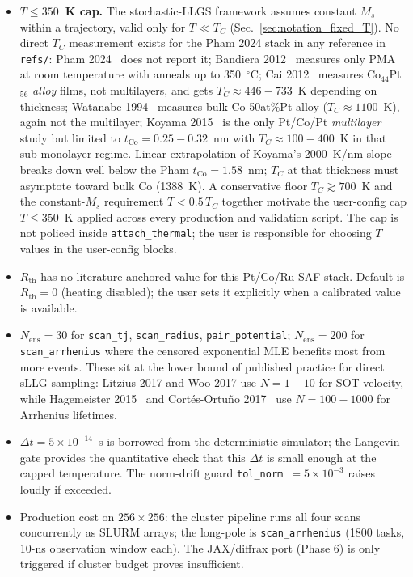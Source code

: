 \documentclass[11pt,a4paper]{article}
\newcommand{\Rth}{R_{\text{th}}}
\begin{document}
\begin{itemize}[leftmargin=2em]
    \item \textbf{$T \le 350$~K cap.} The stochastic-LLGS framework
    assumes constant $M_s$ within a trajectory, valid only for
    $T \ll T_C$ (Sec.~\ref{sec:notation_fixed_T}). No direct $T_C$
    measurement exists for the Pham 2024 stack in any reference in
    \texttt{refs/}: Pham 2024~\cite{pham2024} does not report it;
    Bandiera 2012~\cite{bandiera2012} measures only PMA at room
    temperature with anneals up to 350~$^\circ$C; Cai
    2012~\cite{cai2012} measures Co$_{44}$Pt$_{56}$ \emph{alloy}
    films, not multilayers, and gets $T_C \approx 446{-}733$~K
    depending on thickness; Watanabe 1994~\cite{watanabe1994}
    measures bulk Co-50at\%Pt alloy ($T_C \approx 1100$~K), again
    not the multilayer; Koyama 2015~\cite{koyama2015} is the only
    Pt/Co/Pt \emph{multilayer} study but limited to
    $t_{\text{Co}} = 0.25{-}0.32$~nm with $T_C \approx 100{-}400$~K
    in that sub-monolayer regime. Linear extrapolation of Koyama's
    2000~K/nm slope breaks down well below the Pham
    $t_{\text{Co}} = 1.58$~nm; $T_C$ at that thickness must
    asymptote toward bulk Co (1388~K). A conservative floor
    $T_C \gtrsim 700$~K and the constant-$M_s$ requirement
    $T < 0.5\,T_C$ together motivate the user-config cap
    $T \le 350$~K applied across every production and validation
    script. The cap is not policed inside \texttt{attach\_thermal};
    the user is responsible for choosing $T$ values in the
    user-config blocks.
    \item $\Rth$ has no literature-anchored value for this Pt/Co/Ru
    SAF stack. Default is $\Rth = 0$ (heating disabled); the user
    sets it explicitly when a calibrated value is available.
    \item $N_{\text{ens}} = 30$ for \texttt{scan\_tj},
    \texttt{scan\_radius}, \texttt{pair\_potential};
    $N_{\text{ens}} = 200$ for \texttt{scan\_arrhenius} where the
    censored exponential MLE benefits most from more events. These
    sit at the lower bound of published practice for direct sLLG
    sampling: Litzius 2017 and Woo 2017 use $N = 1{-}10$ for SOT
    velocity, while Hagemeister 2015~\cite{hagemeister2015} and
    Cort\'es-Ortu\~{n}o 2017~\cite{cortes2017} use $N = 100{-}1000$
    for Arrhenius lifetimes.
    \item $\Delta t = 5\times 10^{-14}$~s is borrowed from the
    deterministic simulator; the Langevin gate provides the
    quantitative check that this $\Delta t$ is small enough at the
    capped temperature. The norm-drift guard
    \texttt{tol\_norm}~$=5\times 10^{-3}$ raises loudly if exceeded.
    \item Production cost on $256 \times 256$: the cluster pipeline
    runs all four scans concurrently as SLURM arrays; the
    long-pole is \texttt{scan\_arrhenius} (1800 tasks, 10-ns
    observation window each). The JAX/diffrax port (Phase 6) is
    only triggered if cluster budget proves insufficient.
\end{itemize}
\end{document}
